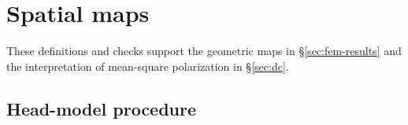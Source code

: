 \section{Spatial maps}\label{supp:spatial}
These definitions and checks support the geometric maps in \S\ref{sec:fem-results}
and the interpretation of mean-square polarization in \S\ref{sec:dc}.
\ifjne


\fi
\ifjne
\subsection{Head-model procedure}\label{supp:fem-protocol}





\fi

